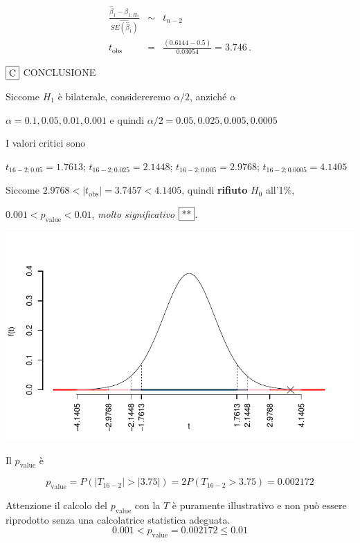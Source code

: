 \documentclass[
  11pt,
]{book}
\theoremstyle{mytheoremstyle}
\theoremstyle{mydefstyle}
\newenvironment{sol}
  {
  \begin{tcolorbox}[enhanced,breakable,arc=0.1mm,boxrule=1pt,colback=white,colframe=iblue,
  title=\bf \fontfamily{lmss}\selectfont \hspace{.5 cm} Soluzione,drop fuzzy shadow]

}{
\end{tcolorbox}
  }
\begin{document}
\begin{sol}
\begin{eqnarray*}
 \frac{\hat\beta_{ 1 } - \beta_{ 1 ;H_0}} {\widehat{SE(\hat\beta_{ 1 })}}&\sim&t_{n-2}\\
   t_{\text{obs}}
&=& \frac{ ( 0.6144 -  0.5 )} { 0.03054 }
 =   3.746 \, .
\end{eqnarray*}

\(\fbox{C}\) CONCLUSIONE

Siccome \(H_1\) è bilaterale, considereremo \(\alpha/2\),
anziché \(\alpha\)

\(\alpha=0.1, 0.05, 0.01, 0.001\) e quindi \(\alpha/2=0.05, 0.025, 0.005, 0.0005\)

I valori critici sono

\(t_{16-2;0.05}=1.7613\); \(t_{16-2;0.025}=2.1448\); \(t_{16-2;0.005}=2.9768\); \(t_{16-2;0.0005}=4.1405\)

Siccome \(2.9768<|t_\text{obs}|=3.7457<4.1405\), quindi \textbf{rifiuto} \(H_0\) all'1\%,

\(0.001<p_\text{value}<0.01\), \emph{molto significativo} \(\fbox{**}\).

\begin{center}\includegraphics{Esami_passati_con_soluzioni_files/figure-latex/06-regr-20,-1} \end{center}

Il \(p_{\text{value}}\) è

\[ p_{\text{value}} = P(|T_{16-2}|>|3.75|)=2P(T_{16-2}>3.75)=0.002172 \]

Attenzione il calcolo del \(p_\text{value}\) con la \(T\) è puramente illustrativo e non può essere riprodotto senza una calcolatrice statistica adeguata.\[
 0.001 < p_\text{value}= 0.002172 \leq 0.01 
\]

\end{sol}
\end{document}
